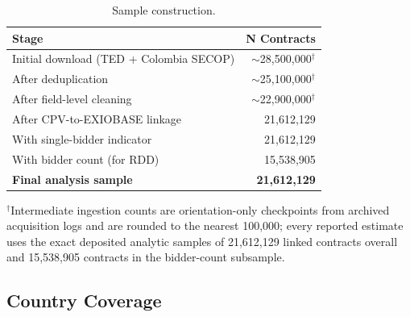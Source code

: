 \documentclass[11pt]{article}
\newcommand{\tabnoteblock}[1]{%
    \par\vspace{0.45em}%
    \begin{minipage}{0.98\linewidth}
    \footnotesize\raggedright #1
    \end{minipage}\par
}
\begin{document}
\begin{table}[H]
\centering
\caption{Sample construction.}
\label{tab:sample}
\begin{tabular}{lr}
\toprule
\textbf{Stage} & \textbf{N Contracts} \\
\midrule
Initial download (TED + Colombia SECOP) & $\sim$28,500,000$^\dagger$ \\
After deduplication & $\sim$25,100,000$^\dagger$ \\
After field-level cleaning & $\sim$22,900,000$^\dagger$ \\
After CPV-to-EXIOBASE linkage & 21,612,129 \\
With single-bidder indicator & 21,612,129 \\
With bidder count (for RDD) & 15,538,905 \\
\midrule
\textbf{Final analysis sample} & \textbf{21,612,129} \\
\bottomrule
\end{tabular}
\tabnoteblock{$^\dagger$Intermediate ingestion counts are orientation-only checkpoints from archived acquisition logs and are rounded to the nearest 100,000; every reported estimate uses the exact deposited analytic samples of 21,612,129 linked contracts overall and 15,538,905 contracts in the bidder-count subsample.}
\end{table}

\subsection{Country Coverage}
\end{document}
